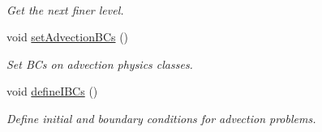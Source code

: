 \begin{DoxyCompactItemize}
$$\begin{DoxyCompactList}\small\item\em Get the next finer level. \end{DoxyCompactList}\item 
\mbox{\label{class_a_m_r_level_mushy_layer_aa8b1365bdf67cc5b82bec6c04a25f6a0}} 
void \hyperlink{class_a_m_r_level_mushy_layer_aa8b1365bdf67cc5b82bec6c04a25f6a0}{set\+Advection\+B\+Cs} ()
\begin{DoxyCompactList}\small\item\em Set B\+Cs on advection physics classes. \end{DoxyCompactList}\item 
\mbox{\label{class_a_m_r_level_mushy_layer_a37fc9d2aa2b584dc78babfc99cacc4ca}} 
void \hyperlink{class_a_m_r_level_mushy_layer_a37fc9d2aa2b584dc78babfc99cacc4ca}{define\+I\+B\+Cs} ()
\begin{DoxyCompactList}\small\item\em Define initial and boundary conditions for advection problems. \end{DoxyCompactList}\end{DoxyCompactItemize}
